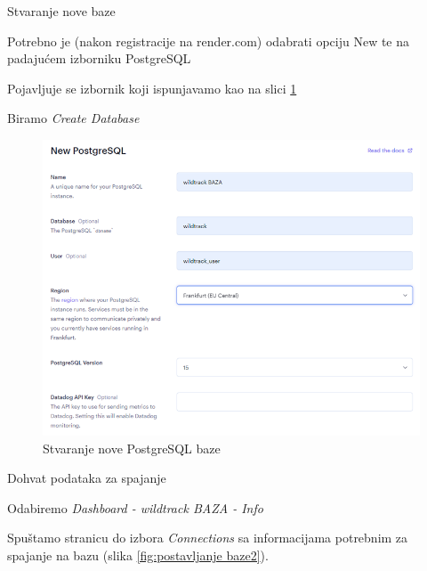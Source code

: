 			\begin{packed_enum}
				\item Stvaranje nove baze
				
				\begin{packed_item}
					\item Potrebno je (nakon registracije na render.com) odabrati opciju New te na padajućem izborniku PostgreSQL
					\item Pojavljuje se izbornik koji ispunjavamo kao na slici \ref{fig:postavljanje baze1}
					\item Biramo \textit{Create Database}
				\end{packed_item}

			\begin{figure}[H]
				\includegraphics[scale=1]{slike/postavljanje baze1.png}
				\centering
				\caption{Stvaranje nove PostgreSQL baze}
				\label{fig:postavljanje baze1}
			\end{figure}

			 \item Dohvat podataka za spajanje
			 \begin{packed_item}
				\item Odabiremo \textit{Dashboard -  wildtrack BAZA -  Info}
				\item Spuštamo stranicu do izbora \textit{Connections} sa informacijama potrebnim za spajanje na bazu (slika \ref{fig:postavljanje baze2}).
			\end{packed_item}


\end{packed_enum}
